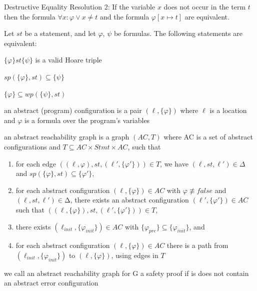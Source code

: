 \documentclass[landscape, a4paper]{article}
\begin{document}
\begin{minipage}[t]{0.2\linewidth}
\begin{betterlist}
\begin{betterlist}
			\item \alert{Destructive Equality Resolution 2:} If the variable $x$ does not occur in the term $t$ then the formula $\forall x:\varphi \lor x \ne t$ and the formula $\varphi[x\mapsto t]$ are equivalent. 
		\end{betterlist}
		\item Let $st$ be a statement, and let $\varphi$, $\psi$ be formulas. The following statements are equivalent:
		\begin{betterlist}
			\item $\{\varphi\} st \{\psi\}$ is a valid Hoare triple
			\item $sp(\{\varphi\}, st) \subseteq \{\psi\}$
			\item $\{\varphi\} \subseteq wp(\{\psi\}, st)$
		\end{betterlist}
	\end{betterlist}
	\begin{betterlist}
		\item \color{orange}an \alert{abstract (program) configuration} is a pair $(\ell, \{\varphi\})$ where $\ell$ is a location and $\varphi$ is a formula over the program’s variables\color{black}
		\item \color{orange}an \alert{abstract reachability graph} is a graph $(AC, T)$ where AC is a set of abstract configurations and $T ⊆AC × Stmt × AC$, such that
		\begin{enumerate}
			\item for each edge $((\ell, {\varphi}), st, (\ell', \{\varphi'\})) \in T$, we have $(\ell, st, \ell') \in \Delta$ and $sp(\{\varphi\}, st) \subseteq \{\varphi'\}$,
			\item for each abstract configuration $(\ell, \{\varphi\}) \in AC$ with $\varphi\not\equiv false$ and $(\ell, st, \ell') \in ∆$, there exists an abstract configuration $(\ell', \{\varphi'\}) \in AC$ such that $((\ell, \{\varphi\}), st, (\ell', \{\varphi'\})) \in T$,
			\item there exists $(\ell_{init}, \{\varphi_{init}\}) \in AC$ with $\{\varphi_{pre}\} \subseteq \{\varphi_{init}\}$, and
			\item for each abstract configuration $(\ell, \{\varphi\}) \in AC$ there is a path from $(\ell_{init}, \{\varphi_{init}\})$ to $(\ell, \{\varphi\})$, using edges in $T$
		\end{enumerate}\color{black}
		\begin{betterlist}
			\item \color{orange}we call an abstract reachability graph for G a \alert{safety proof} if is does not contain an abstract error configuration\color{black}

\end{betterlist}
\end{betterlist}
\end{minipage}
\end{document}
